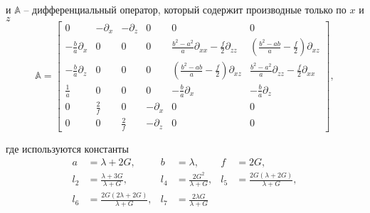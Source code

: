 и $\mathbb{A}$ -- дифференциальный оператор, который содержит производные только по $x$ и $z$
\begin{equation}
    \label{eq:A}
    \mathbb{A} = 
    \left[\begin{array}{cccccc}
        0                      & -\partial_x & -\partial_z & 0 & 0 & 0 \\
        -\frac{b}{a}\partial_x & 0           & 0 & 0 & \frac{b^2-a^2}{a}\partial_{xx} - \frac{f}{2}\partial_{zz} & \left( \frac{b^2-ab}{a} - \frac{f}{2} \right) \partial_{xz} \\
        -\frac{b}{a}\partial_z & 0           & 0 & 0 & \left( \frac{b^2-ab}{a} - \frac{f}{2} \right) \partial_{xz} & \frac{b^2-a^2}{a}\partial_{zz} - \frac{f}{2}\partial_{xx} \\
        \frac{1}{a}            & 0           & 0 & 0 & -\frac{b}{a}\partial_x & -\frac{b}{a}\partial_z \\
        0                      & \frac{2}{f} & 0 & -\partial_x & 0 & 0 \\
        0                      & 0           & \frac{2}{f} & -\partial_z & 0 & 0 
    \end{array}\right],
\end{equation}

где используются константы
\begin{align*}
    a   & = \lambda + 2G,                          & b   & = \lambda,                &     f & = 2G, \\
    l_2 & = \frac{\lambda + 3G}{\lambda + G},      & l_4 & = \frac{2G^2}{\lambda+G}, &   l_5 & = \frac{2G(\lambda + 2G)}{\lambda + G}, \\
    l_6 & = \frac{2G(2\lambda + 2G)}{\lambda + G}, & l_7 & = \frac{2\lambda G}{\lambda+G}
\end{align*}


